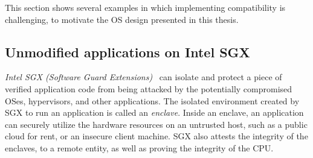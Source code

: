 This section shows several examples in which implementing compatibility is challenging, to motivate the OS design presented in this thesis.


\subsection{Unmodified applications on Intel SGX}

{\em Intel SGX (Software Guard Extensions)}~\cite{intelsgx}
can isolate and protect a piece of verified application code from being attacked by the potentially compromised OSes, hypervisors, and other applications.
The isolated environment created by SGX to run an application is called an {\em enclave}. Inside an enclave, an application can securely utilize the hardware resources on an untrusted host,
such as a public cloud for rent, or an insecure client machine.
SGX also attests the integrity of the enclaves, to a remote entity, as well as proving the integrity of the CPU.



